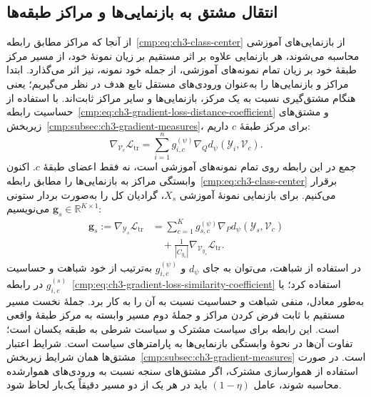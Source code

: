 \subsection{انتقال مشتق به بازنمایی‌ها و مراکز طبقه‌ها}
\label{cmp:subsec:ch3-gradient-centers-representations}

از آنجا که مراکز مطابق
رابطه~\eqref{cmp:eq:ch3-class-center}
از بازنمایی‌های آموزشی محاسبه می‌شوند، هر
بازنمایی علاوه بر اثر مستقیم بر زیان نمونهٔ خود،
از مسیر مرکز طبقهٔ خود بر زیان تمام نمونه‌های
آموزشی، از جمله خود نمونه، نیز اثر می‌گذارد.
ابتدا مراکز و بازنمایی‌ها را به‌عنوان ورودی‌های
مستقل تابع هدف در نظر می‌گیریم؛ یعنی هنگام
مشتق‌گیری نسبت به یک مرکز، بازنمایی‌ها و سایر
مراکز ثابت‌اند. با استفاده از حساسیت
رابطه~\eqref{cmp:eq:ch3-gradient-loss-distance-coefficient}
و مشتق‌های زیربخش~\ref{cmp:subsec:ch3-gradient-measures}،
برای مرکز طبقهٔ $c$ داریم:
\begin{equation}\label{cmp:eq:ch3-gradient-center-accumulation}
\nabla_{\mathcal V_c}\mathcal L_{\mathrm{tr}}
=\sum_{i=1}^{n}g_{i,c}^{(\psi)}
\nabla_Q d_\psi(\mathscr Y_i,\mathcal V_c).
\end{equation}
جمع در این رابطه روی تمام نمونه‌های آموزشی
است، نه فقط اعضای طبقهٔ $c$.
اکنون وابستگی مراکز به بازنمایی‌ها را مطابق
رابطه~\eqref{cmp:eq:ch3-class-center} برقرار
می‌کنیم. برای بازنمایی نمونهٔ آموزشی $X_s$،
گرادیان کل را به‌صورت بردار ستونی
$\mathbf g_s\in\mathbb R^{K\times1}$ می‌نویسیم:
\begin{equation}\label{cmp:eq:ch3-gradient-representation-total}
\boxed{\begin{aligned}
\mathbf g_s
:=\nabla_{\mathscr Y_s}\mathcal L_{\mathrm{tr}}
&=\sum_{c=1}^{K}g_{s,c}^{(\psi)}
\nabla_P d_\psi(\mathscr Y_s,\mathcal V_c)\\
&\quad+\frac1{|C_{y_s}|}
\nabla_{\mathcal V_{y_s}}\mathcal L_{\mathrm{tr}}.
\end{aligned}}
\end{equation}
در استفاده از شباهت، می‌توان به جای $d_\psi$
و $g_{i,c}^{(\psi)}$ به‌ترتیب از خود شباهت و
حساسیت $g_{i,c}^{(s)}$ در
رابطه~\eqref{cmp:eq:ch3-gradient-loss-similarity-coefficient}
استفاده کرد؛ یا به‌طور معادل، منفی شباهت و
حساسیت نسبت به آن را به کار برد.
جملهٔ نخست مسیر مستقیم با ثابت فرض کردن مراکز
و جملهٔ دوم مسیر وابسته به مرکز طبقهٔ واقعی
است. این رابطه برای سیاست مشترک و سیاست شرطی
به طبقه یکسان است؛ تفاوت آن‌ها در نحوهٔ
وابستگی بازنمایی‌ها به پارامترهای سیاست است.
شرایط اعتبار مشتق‌ها همان شرایط
زیربخش~\ref{cmp:subsec:ch3-gradient-measures} است.
در صورت استفاده از هموارسازی مشترک، اگر مشتق‌های
سنجه نسبت به ورودی‌های هموارشده محاسبه شوند،
عامل $(1-\eta)$ باید در هر یک از دو مسیر
دقیقاً یک‌بار لحاظ شود.

